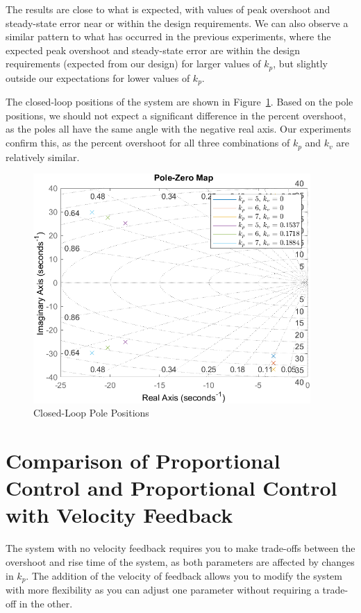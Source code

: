 \documentclass[12pt]{article}
\begin{document}
The results are close to what is expected, with values of peak overshoot and steady-state error near or within the design requirements. We can also observe a similar pattern to what has occurred in the previous experiments, where the expected peak overshoot and steady-state error are within the design requirements (expected from our design) for larger values of $k_p$, but slightly outside our expectations for lower values of $k_p$.

The closed-loop positions of the system are shown in Figure~\ref{fig:exp3_pole}. Based on the pole positions, we should not expect a significant difference in the percent overshoot, as the poles all have the same angle with the negative real axis. Our experiments confirm this, as the percent overshoot for all three combinations of $k_p$ and $k_v$ are relatively similar.

\begin{figure}[h]
    \centering
    \includegraphics[width=0.94\textwidth]{exp3_pole}
    \caption{\label{fig:exp3_pole}Closed-Loop Pole Positions}
\end{figure}

\section*{Comparison of Proportional Control and Proportional Control with Velocity Feedback}
The system with no velocity feedback requires you to make trade-offs between the overshoot and rise time of the system, as both parameters are affected by changes in $k_p$. The addition of the velocity of feedback allows you to modify the system with more flexibility as you can adjust one parameter without requiring a trade-off in the other.
 
\end{document}
